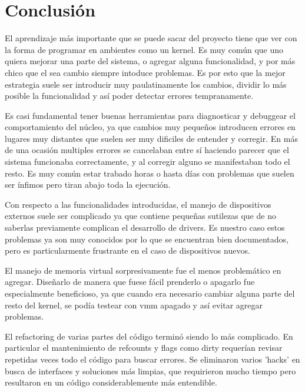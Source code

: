 \section{Conclusión}

El aprendizaje más importante que se puede sacar del proyecto tiene que ver con
la forma de programar en ambientes como un kernel. Es muy común que uno quiera
mejorar una parte del sistema, o agregar alguna funcionalidad, y por más chico
que el sea cambio siempre intoduce problemas. Es por esto que la mejor
estrategia suele ser introducir muy paulatinamente los cambios, dividir lo más
posible la funcionalidad y así poder detectar errores tempranamente.

Es casi fundamental tener buenas herramientas para diagnosticar y debuggear el
comportamiento del núcleo, ya que cambios muy pequeños introducen errores en
lugares muy distantes que suelen ser muy dificiles de entender y corregir. En
más de una ocasión multiples errores se cancelaban entre sí haciendo parecer que
el sistema funcionaba correctamente, y al corregir alguno se manifestaban todo
el resto. Es muy común estar trabado horas o hasta días con problemas que suelen
ser ínfimos pero tiran abajo toda la ejecución.

Con respecto a las funcionalidades introducidas, el manejo de dispositivos
externos suele ser complicado ya que contiene pequeñas sutilezas que de no
saberlas previamente complican el desarrollo de drivers. Es nuestro caso estos
problemas ya son muy conocidos por lo que se encuentran bien documentados, pero
es particularmente frustrante en el caso de dispositivos nuevos.

El manejo de memoria virtual sorpresivamente fue el menos problemático en
agregar. Diseñarlo de manera que fuese fácil prenderlo o apagarlo fue
especialmente beneficioso, ya que cuando era necesario cambiar alguna parte del
resto del kernel, se podía testear con vmm apagado y así evitar agregar
problemas.

El refactoring de varias partes del código terminó siendo lo más complicado. En
particular el mantenimiento de refcounts y flags como dirty requerían revisar
repetidas veces todo el código para buscar errores. Se eliminaron varios 'hacks'
en busca de interfaces y soluciones más limpias, que requirieron mucho tiempo
pero resultaron en un código considerablemente más entendible.
